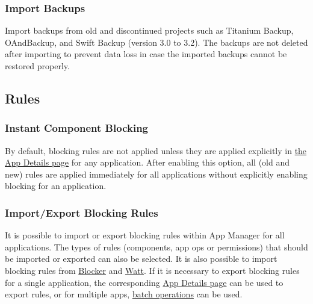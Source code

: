 \subsubsection{Import Backups} %
Import backups from old and discontinued projects such as Titanium Backup, OAndBackup, and Swift Backup (version 3.0 to 3.2).
The backups are not deleted after importing to prevent data loss in case the imported backups cannot be restored properly.

\subsection{Rules}\label{subsec:rules} %

\subsubsection{Instant Component Blocking}\label{subsubsec:instant-component-blocking} %
By default, blocking rules are not applied unless they are applied explicitly in \hyperref[sec:app-details-page]{the App Details page} for any application.
After enabling this option, all (old and new) rules are applied immediately for all applications without explicitly enabling blocking for an application.


\subsubsection{Import/Export Blocking Rules} %
It is possible to import or export blocking rules within App Manager for all applications. The types of rules (components, app ops or permissions) that should be imported or exported can also be selected.
It is also possible to import blocking rules from \href{https://github.com/lihenggui/blocker}{Blocker} and \href{https://github.com/tuyafeng/Watt}{Watt}.
If it is necessary to export blocking rules for a single application, the corresponding \hyperref[sec:app-details-page]{App Details page} can be used to export rules, or for multiple apps, \hyperref[subsec:batch-operations]{batch operations} can be used.


